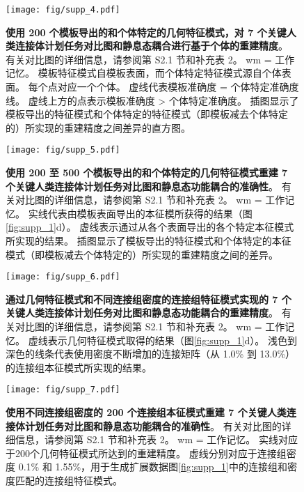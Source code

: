 \documentclass[lang=cn,a4paper,newtx]{elegantpaper}
\begin{document}
\begin{figure}[!htb] 
	\centering
	\texttt{[image: fig/supp\_4.pdf]}
	\caption{\textbf{使用 200 个模板导出的和个体特定的几何特征模式，对 7 个关键人类连接体计划任务对比图和静息态耦合进行基于个体的重建精度}。
		有关对比图的详细信息，请参阅第 S2.1 节和补充表 2。
		wm = 工作记忆。
		模板特征模式自模板表面，而个体特定特征模式源自个体表面。
		每个点对应一个个体。
		虚线代表模板准确度 = 个体特定准确度线。
		虚线上方的点表示模板准确度 > 个体特定准确度。
		插图显示了模板导出的特征模式和个体特定的特征模式（即模板减去个体特定的）所实现的重建精度之间差异的直方图。} \label{fig:supp_4}
\end{figure}


\begin{figure}[!htb] 
	\centering
	\texttt{[image: fig/supp\_5.pdf]}
	\caption{\textbf{使用 200 至 500 个模板导出的和个体特定的几何特征模式重建 7 个关键人类连接体计划任务对比图和静息态功能耦合的准确性}。
		有关对比图的详细信息，请参阅第 S2.1 节和补充表 2。
		wm = 工作记忆。
		实线代表由模板表面导出的本征模所获得的结果（图\ref{fig:supp_1}d）。
		虚线表示通过从各个表面导出的各个特定本征模式所实现的结果。
		插图显示了模板导出的特征模式和个体特定的本征模式（即模板减去个体特定的）所实现的重建精度之间的差异。} \label{fig:supp_5}
\end{figure}



\begin{figure}[!htb] 
	\centering
	\texttt{[image: fig/supp\_6.pdf]}
	\caption{
		\textbf{通过几何特征模式和不同连接组密度的连接组特征模式实现的 7 个关键人类连接体计划任务对比图和静息态功能耦合的重建精度}。
		有关对比图的详细信息，请参阅第 S2.1 节和补充表 2。
		wm = 工作记忆。
		虚线表示几何特征模式取得的结果（图\ref{fig:supp_1}d）。
		浅色到深色的线条代表使用密度不断增加的连接矩阵（从 1.0\% 到 13.0\%）的连接组本征模式所实现的结果。
	} \label{fig:supp_6}
\end{figure}


\begin{figure}[!htb] 
	\centering
	\texttt{[image: fig/supp\_7.pdf]}
	\caption{
		\textbf{使用不同连接组密度的 200 个连接组本征模式重建 7 个关键人类连接体计划任务对比图和静息态功能耦合的准确性}。
		有关对比图的详细信息，请参阅第 S2.1 节和补充表 2。
		wm = 工作记忆。
		实线对应于200个几何特征模式所达到的重建精度。
		虚线分别对应于连接组密度 0.1\% 和 1.55\%，用于生成扩展数据图\ref{fig:supp_1}中的连接组和密度匹配的连接组特征模式。
	} \label{fig:supp_7}
\end{figure}
\end{document}
